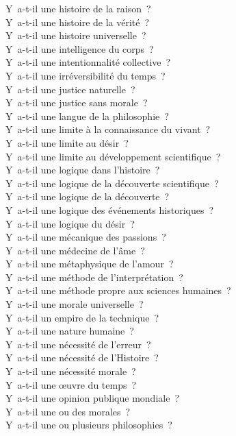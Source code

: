 \documentclass[a4paper,12pt]{article}
\begin{document}
Y a-t-il une histoire de la raison ? \\
Y a-t-il une histoire de la vérité ? \\
Y a-t-il une histoire universelle ? \\
Y a-t-il une intelligence du corps ? \\
Y a-t-il une intentionnalité collective ? \\
Y a-t-il une irréversibilité du temps ? \\
Y a-t-il une justice naturelle ? \\
Y a-t-il une justice sans morale ? \\
Y a-t-il une langue de la philosophie ? \\
Y a-t-il une limite à la connaissance du vivant ? \\
Y a-t-il une limite au désir ? \\
Y a-t-il une limite au développement scientifique ? \\
Y a-t-il une logique dans l'histoire ? \\
Y a-t-il une logique de la découverte scientifique ? \\
Y a-t-il une logique de la découverte ? \\
Y a-t-il une logique des événements historiques ? \\
Y a-t-il une logique du désir ? \\
Y a-t-il une mécanique des passions ? \\
Y a-t-il une médecine de l'âme ? \\
Y a-t-il une métaphysique de l'amour ? \\
Y a-t-il une méthode de l'interprétation ? \\
Y a-t-il une méthode propre aux sciences humaines ? \\
Y a-t-il une morale universelle ? \\
Y a-t-il un empire de la technique ? \\
Y a-t-il une nature humaine ? \\
Y a-t-il une nécessité de l'erreur ? \\
Y a-t-il une nécessité de l'Histoire ? \\
Y a-t-il une nécessité morale ? \\
Y a-t-il une œuvre du temps ? \\
Y a-t-il une opinion publique mondiale ? \\
Y a-t-il une ou des morales ? \\
Y a-t-il une ou plusieurs philosophies ? \\
\end{document}
